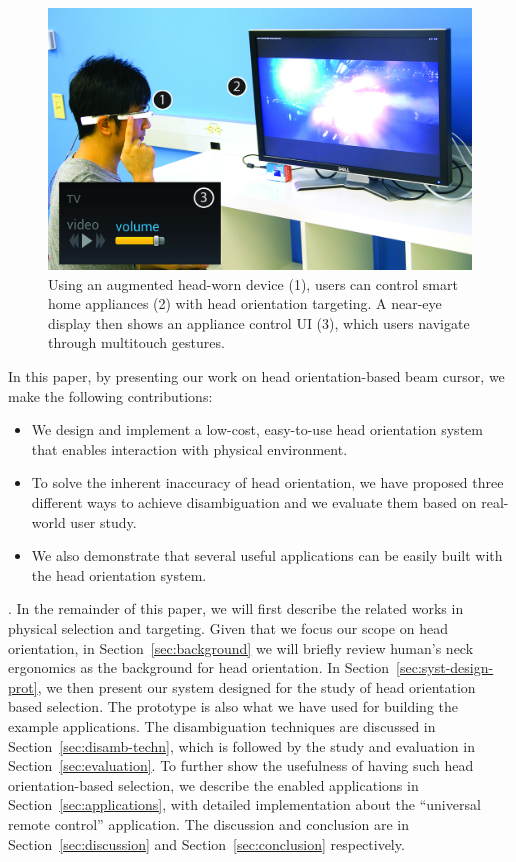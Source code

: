 \begin{figure}[t]
\centering
\includegraphics[width=1.0\columnwidth]{figures/teaser.jpg}
\caption{Using an augmented head-worn device (1), users can control smart home appliances (2) with head orientation targeting. A near-eye display then shows an appliance control UI (3), which users navigate through multitouch gestures.}
\label{fig:teaser}
\end{figure}

In this paper, by presenting our work on head orientation-based beam cursor,  we make the following contributions:
\begin{itemize}
\item We design and implement a low-cost, easy-to-use head orientation system that enables interaction with physical environment.
\item To solve the inherent inaccuracy of head orientation, we have proposed three different ways to achieve disambiguation and we evaluate them based on real-world user study.
\item We also demonstrate that several useful applications can be easily built with the head orientation system.
\end{itemize}

.
In the remainder of this paper, we will first describe the related works in physical selection and targeting. Given that we focus our scope on head orientation, in Section~\ref{sec:background} we will briefly review human's neck ergonomics as the background for head orientation. In Section~\ref{sec:syst-design-prot}, we then present our system designed for the study of head orientation based selection. The prototype is also what we have used for building the example applications. The disambiguation techniques are discussed in Section~\ref{sec:disamb-techn}, which is followed by the study and evaluation in Section~\ref{sec:evaluation}. To further show the usefulness of having such head orientation-based selection, we describe the enabled applications in Section~\ref{sec:applications}, with detailed implementation about the ``universal remote control'' application. The discussion and conclusion are in Section~\ref{sec:discussion} and Section~\ref{sec:conclusion} respectively. 

